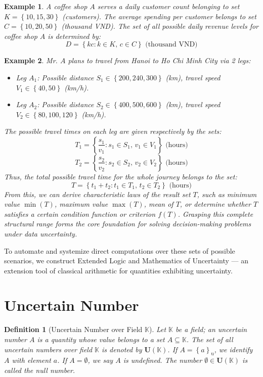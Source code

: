 \documentclass[a4paper,12pt, twoside]{memoir}
\newtheorem{definition}{Definition}[chapter]
\newtheorem{example}{Example}[chapter]
\newcommand{\set}[1]{\left\{#1\right\}} %
\newcommand{\s}[1]{\set{#1}_\mathrm{u}} %
\newcommand{\tsbd}[1]{\mathbf{U}(\mathbb{#1})}
\begin{document}
\begin{example}
	A coffee shop $A$ serves a daily customer count belonging to set $K = \set{10, 15, 30}$ (customers). The average spending per customer belongs to set $C = \set{10, 20, 50}$ (thousand VND). The set of all possible daily revenue levels for coffee shop $A$ is determined by:
	\[
		D = \set{kc : k \in K, \, c \in C}  \text{ (thousand VND)}
	\]
\end{example}

\begin{example}
	Mr. $A$ plans to travel from Hanoi to Ho Chi Minh City via 2 legs:
	\begin{itemize}[leftmargin=*]
		\item Leg $A_1$: Possible distance $S_1 \in \set{200, 240, 300}$ (km), travel speed $V_1 \in \set{40, 50}$ (km/h).
		\item Leg $A_2$: Possible distance $S_2 \in \set{400, 500, 600}$ (km), travel speed $V_2 \in \set{80, 100, 120}$ (km/h).
	\end{itemize}
	The possible travel times on each leg are given respectively by the sets:
	\[
		T_1 = \set{\frac{s_1}{v_1} : s_1 \in S_1, \, v_1 \in V_1} \text{ (hours)}
	\]
	\[
		T_2 = \set{\frac{s_2}{v_2} : s_2 \in S_2, \, v_2 \in V_2}  \text{ (hours)}
	\]
	Thus, the total possible travel time for the whole journey belongs to the set:
	\[
		T = \set{t_1 + t_2 : t_1 \in T_1, \, t_2 \in T_2} \text{ (hours)}
	\]
	From this, we can derive characteristic laws of the result set $T$, such as minimum value $\min(T)$, maximum value $\max(T)$, mean of $T$, or determine whether $T$ satisfies a certain condition function or criterion $f(T)$. Grasping this complete structural range forms the core foundation for solving decision-making problems under data uncertainty.
\end{example}

To automate and systemize direct computations over these sets of possible scenarios, we construct Extended Logic and Mathematics of Uncertainty — an extension tool of classical arithmetic for quantities exhibiting uncertainty.

\section{Uncertain Number}
\begin{definition}[Uncertain Number over Field $\mathbb{K}$]
	Let $\mathbb{K}$ be a field; an uncertain number $A$ is a quantity whose value belongs to a set $A \subseteq \mathbb{K}$. The set of all uncertain numbers over field $\mathbb{K}$ is denoted by $\tsbd{K}$. If $A =\s{a}$, we identify $A$ with element $a$. If $A =\emptyset$, we say $A$ is undefined. The number $\emptyset \in \tsbd{K}$ is called the null number.
\end{definition}
\end{document}

